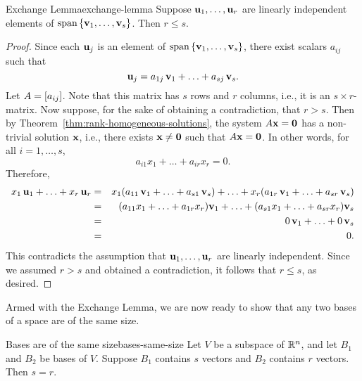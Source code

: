 \begin{lemma}{Exchange Lemma}{exchange-lemma}
  Suppose $\mbox{\bf u}_{1},\ldots,\mbox{\bf u}_{r}$ are linearly independent
  elements of $\sspan\set{\vect{v}_{1},\ldots,\vect{v}_{s}}$. Then
  $r\leq s$.
\end{lemma}

\begin{proof}
  Since each $\mbox{\bf u}_j$ is an element of
  $\sspan\set{\vect{v}_{1},\ldots,\vect{v}_{s}}$, there exist
  scalars $a_{ij}$ such that
  \begin{equation*}
    \mbox{\bf u}_{j} = a_{1j}\,\mbox{\bf v}_1 + \ldots + a_{sj}\,\mbox{\bf v}_s.
  \end{equation*}
  Let $A = \left[a_{ij}\right]$. Note that this matrix has $s$ rows and $r$
  columns, i.e., it is an $s\times r$-matrix. Now suppose, for the
  sake of obtaining a contradiction, that $r>s$. Then by
  Theorem~\ref{thm:rank-homogeneous-solutions}, the system
  $A\mbox{\bf x}=\mbox{\bf 0}$ has a non-trivial solution $\mbox{\bf x}$, i.e.,
  there exists $\mbox{\bf x}\neq\mbox{\bf 0}$ such that $A\mbox{\bf x}=\mbox{\bf 0}$.
  In other words, for all $i=1,\ldots,s$,
  \begin{equation*}
    a_{i1}x_1 + \ldots + a_{ir}x_r = 0.
  \end{equation*}
  Therefore,
  \begin{eqnarray*}
    x_1\,\mbox{\bf u}_1 + \ldots + x_r\,\mbox{\bf u}_r
    &=&
        x_1(a_{11}\,\mbox{\bf v}_1 + \ldots + a_{s1}\,\mbox{\bf v}_s)
        + \ldots
        + x_r(a_{1r}\,\mbox{\bf v}_1 + \ldots + a_{sr}\,\mbox{\bf v}_s)
    \\
    &=&
        (a_{11}x_1 + \ldots + a_{1r}x_r)\mbox{\bf v}_1
        + \ldots
        + (a_{s1}x_1 + \ldots + a_{sr}x_r)\mbox{\bf v}_s
    \\
    &=& 0\,\mbox{\bf v}_1 + \ldots + 0\,\mbox{\bf v}_s
    \\
    &=& 0.
  \end{eqnarray*}
  This contradicts the assumption that
  $\mbox{\bf u}_{1},\ldots,\mbox{\bf u}_{r}$ are linearly independent. Since
  we assumed $r>s$ and obtained a contradiction, it follows that
  $r\leq s$, as desired.
\end{proof}

Armed with the Exchange Lemma, we are now ready to show that any two
bases of a space are of the same size.

\begin{theorem}{Bases are of the same size}{bases-same-size}
  Let $V$ be a subspace of\/ $\mathbb{R}^{n}$, and let $B_1$ and $B_2$ be
  bases of $V$. Suppose $B_1$ contains $s$ vectors and $B_2$ contains
  $r$ vectors. Then $s=r$.
\end{theorem}

